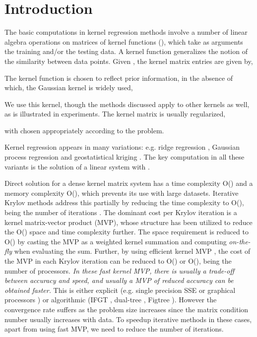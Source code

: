 \documentclass[10pt,journal,letterpaper,compsoc]{IEEEtran}
\begin{document}
\maketitle
\IEEEdisplaynotcompsoctitleabstractindextext
\IEEEpeerreviewmaketitle

\section{Introduction}
The basic computations in kernel regression methods involve a number of linear algebra operations on matrices of kernel functions (), which take as arguments the training and/or the testing data. A kernel function  generalizes the notion of the similarity between data points. Given , the kernel matrix entries are given by,

The kernel function  is chosen to reflect prior information, in the absence of which, the Gaussian kernel  is widely used,

We use this kernel, though the methods discussed apply to other kernels as well, as is illustrated in experiments. The kernel matrix is usually regularized,

with  chosen appropriately according to the problem.

Kernel regression appears in many variations: e.g. ridge regression \cite{BishopML}, Gaussian process regression \cite{GPML_Rasmussen} and geostatistical kriging \cite{AppliedGeostatistics}. The key computation in all these variants is the solution of a linear system with .

Direct solution for a dense kernel matrix system has a time complexity O() and a memory complexity O(), which prevents its use with large datasets. Iterative Krylov methods \cite{SaadIterativeMethods} address this partially by reducing the time complexity to O(),  being the number of iterations \cite{GPML_Mackay,NandoKrylov}. The dominant cost per Krylov iteration is a kernel matrix-vector product (MVP), whose structure has been utilized to reduce the O() space and time complexity further. The space requirement is reduced to O() by casting the MVP as a weighted kernel summation and computing  \emph{on-the-fly} when evaluating the sum. Further, by using efficient kernel MVP \cite{IFGT_Yang,IFGT_Raykar,DualTree,FIGTREE,GPUML}, the cost of the MVP in each Krylov iteration can be reduced to O() or O(),  being the number of processors. \emph{In these fast kernel MVP, there is usually a trade-off between accuracy and speed, and usually a MVP of reduced accuracy can be obtained faster.} This is either explicit (e.g. single precision SSE or graphical processors \cite{GPUML}) or algorithmic (IFGT \cite{IFGT_Yang,IFGT_Raykar}, dual-tree \cite{DualTree}, Figtree \cite{FIGTREE}). However the convergence rate suffers as the problem size increases since the matrix condition number usually increases with data. To speedup iterative methods in these cases, apart from using fast MVP, we need to reduce the number of iterations.
\end{document}
